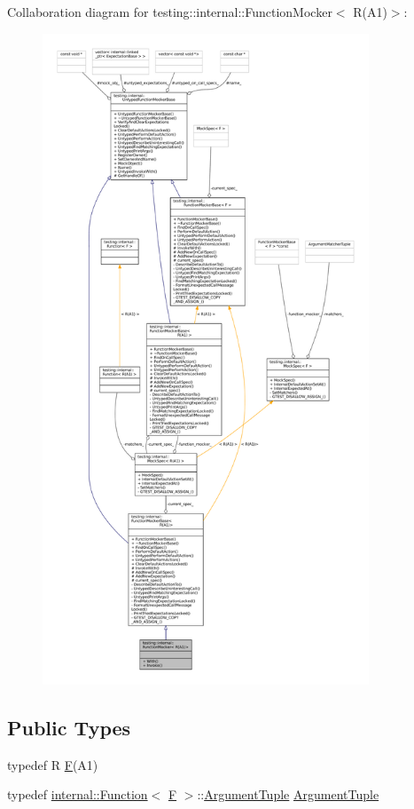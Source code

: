 Collaboration diagram for testing\+:\+:internal\+:\+:Function\+Mocker$<$ R(A1)$>$\+:
\nopagebreak
\begin{figure}[H]
\begin{center}
\leavevmode
\includegraphics[height=550pt]{classtesting_1_1internal_1_1FunctionMocker_3_01R_07A1_08_4__coll__graph}
\end{center}
\end{figure}
\subsection*{Public Types}
\begin{DoxyCompactItemize}
\item 
typedef R \hyperlink{classtesting_1_1internal_1_1FunctionMocker_3_01R_07A1_08_4_ada54286442ab14a18c2308cef748848f}{F}(A1)
\item 
typedef \hyperlink{structtesting_1_1internal_1_1Function}{internal\+::\+Function}$<$ \hyperlink{classtesting_1_1internal_1_1FunctionMocker_3_01R_07A1_08_4_ada54286442ab14a18c2308cef748848f}{F} $>$\+::\hyperlink{classtesting_1_1internal_1_1FunctionMocker_3_01R_07A1_08_4_aacec6412ac4343c071d7dfe965558b0b}{Argument\+Tuple} \hyperlink{classtesting_1_1internal_1_1FunctionMocker_3_01R_07A1_08_4_aacec6412ac4343c071d7dfe965558b0b}{Argument\+Tuple}
\end{DoxyCompactItemize}
